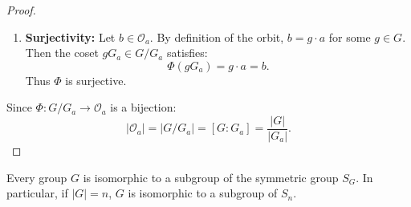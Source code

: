 \begin{proof}
\begin{enumerate}[label=\arabic*., leftmargin=*]
    \item \textbf{Surjectivity:}
    Let $b \in \mathcal{O}_a$. By definition of the orbit, $b = g \cdot a$ for some $g \in G$.
    Then the coset $g G_a \in G/G_a$ satisfies:
    \begin{equation*}
    \Phi(g G_a) = g \cdot a = b.
    \end{equation*}
    Thus $\Phi$ is surjective.
\end{enumerate}
Since $\Phi: G/G_a \to \mathcal{O}_a$ is a bijection:
\begin{equation*}
|\mathcal{O}_a| = |G/G_a| = [G : G_a] = \frac{|G|}{|G_a|}.
\end{equation*}
\end{proof}

\begin{theorem}
\label{thm:cayley}
Every group $G$ is isomorphic to a subgroup of the symmetric group $S_G$. In particular, if $|G| = n$, $G$ is isomorphic to a subgroup of $S_n$.
\end{theorem}

